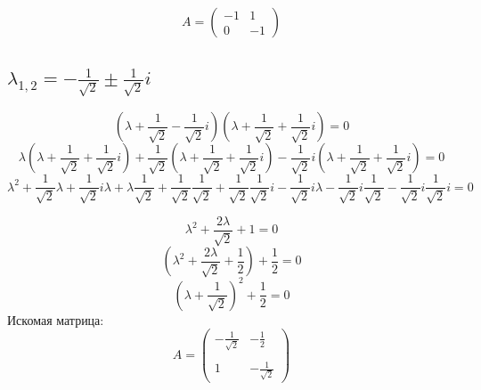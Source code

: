 \documentclass[a5paper, 10pt]{article}
\theoremstyle{definition}
\theoremstyle{plain}
\theoremstyle{remark}
\begin{document}
\begin{equation}
A =
\begin{pmatrix}
-1&1 \\
0& -1
\end{pmatrix}
\end{equation}


\subsection{$\lambda_{1, 2} = -\frac{1}{\sqrt{2}} \pm \frac{1}{\sqrt{2}} i$}

\begin{equation}
\left( \lambda + \frac{1}{\sqrt{2}} - \frac{1}{\sqrt{2}} i \right)\left( \lambda + \frac{1}{\sqrt{2}} + \frac{1}{\sqrt{2}} i \right)=0
\end{equation}
\begin{equation}
\lambda \left( \lambda + \frac{1}{\sqrt{2}} + \frac{1}{\sqrt{2}} i \right) + \frac{1}{\sqrt{2}} \left( \lambda + \frac{1}{\sqrt{2}} + \frac{1}{\sqrt{2}} i \right) - \frac{1}{\sqrt{2}} i \left( \lambda + \frac{1}{\sqrt{2}} + \frac{1}{\sqrt{2}} i \right) =0
\end{equation}
\begin{equation}
  \lambda^2 + \frac{1}{\sqrt{2}}\lambda + \frac{1}{\sqrt{2}} i\lambda + \lambda\frac{1}{\sqrt{2}} + \frac{1}{\sqrt{2}}  \frac{1}{\sqrt{2}} + \frac{1}{\sqrt{2}} \frac{1}{\sqrt{2}} i  - \frac{1}{\sqrt{2}} i\lambda - \frac{1}{\sqrt{2}} i \frac{1}{\sqrt{2}} - \frac{1}{\sqrt{2}} i \frac{1}{\sqrt{2}} i  =0
\end{equation}

\begin{equation}
  \lambda^2 + \frac{2\lambda}{\sqrt{2}} + 1  =0
\end{equation}
\begin{equation}
 \left( \lambda^2 + \frac{2\lambda}{\sqrt{2}} + \frac{1}{2} \right) + \frac{1}{2}  =0
\end{equation}
\begin{equation}
 \left( \lambda + \frac{1}{\sqrt{2}} \right)^2 + \frac{1}{2}  =0
\end{equation}
Искомая матрица:
\begin{equation}
A =
\begin{pmatrix}
-\frac{1}{\sqrt{2}} & -\frac{1}{2} \\
\\
1 & -\frac{1}{\sqrt{2}}
\end{pmatrix}
\end{equation}
\end{document}
